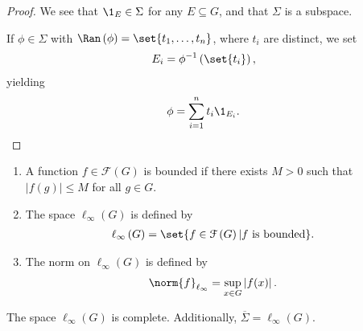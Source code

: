 \begin{proof}
  We see that $\1_{E}\in \Sigma$ for any $E\subseteq G$, and that $\Sigma$ is a subspace.\newline

  If $\phi\in \Sigma$ with $\Ran\left(\phi\right) = \set{t_1,\dots,t_n}$, where $t_i$ are distinct, we set
  \begin{align*}
    E_i &= \phi^{-1}\left(\set{t_i}\right),
  \end{align*}
  yielding
  \begin{align*}
    \phi &= \sum_{i=1}^{n}t_i\1_{E_i}.
  \end{align*}
\end{proof}
\begin{definition}\hfill
  \begin{enumerate}[(1)]
    \item A function $f\in \mathcal{F}\left(G\right)$ is bounded if there exists $M > 0$ such that $\left\vert f(g) \right\vert \leq M$ for all $g\in G$.
    \item The space $\ell_{\infty}\left(G\right)$ is defined by
      \begin{align*}
        \ell_{\infty}\left(G\right) &= \set{f\in \mathcal{F}\left(G\right)| f\text{ is bounded}}.
      \end{align*}
    \item The norm on $\ell_{\infty}\left(G\right)$ is defined by
      \begin{align*}
        \norm{f}_{\ell_{\infty}} &= \sup_{x\in G}\left\vert f(x) \right\vert.
      \end{align*}
  \end{enumerate}
\end{definition}
\begin{proposition}
  The space $\ell_{\infty}(G)$ is complete. Additionally, $\overline{\Sigma} = \ell_{\infty}\left(G\right)$.
\end{proposition}
